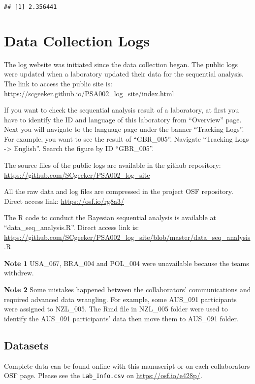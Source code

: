 \documentclass[
  man,floatsintext]{apa7}
\begin{document}
\begin{verbatim}
## [1] 2.356441
\end{verbatim}

\hypertarget{data-collection-logs}{%
\section{Data Collection Logs}\label{data-collection-logs}}

The log website was initiated since the data collection began. The public logs were updated when a laboratory updated their data for the sequential analysis. The link to access the public site is: \url{https://scgeeker.github.io/PSA002_log_site/index.html}

If you want to check the sequential analysis result of a laboratory, at first you have to identify the ID and language of this laboratory from ``Overview'' page. Next you will navigate to the language page under the banner ``Tracking Logs''. For example, you want to see the result of ``GBR\_005''. Navigate ``Tracking Logs -\textgreater{} English''. Search the figure by ID ``GBR\_005''.

The source files of the public logs are available in the github repository:
\url{https://github.com/SCgeeker/PSA002_log_site}

All the raw data and log files are compressed in the project OSF repository. Direct access link: \url{https://osf.io/rg8a3/}

The R code to conduct the Bayesian sequential analysis is available at ``data\_seq\_analysis.R''. Direct access link is: \url{https://github.com/SCgeeker/PSA002_log_site/blob/master/data_seq_analysis.R}

\textbf{Note 1} USA\_067, BRA\_004 and POL\_004 were unavailable because the teams withdrew.

\textbf{Note 2} Some mistakes happened between the collaborators' communications and required advanced data wrangling. For example, some AUS\_091 participants were assigned to NZL\_005. The Rmd file in NZL\_005 folder were used to identify the AUS\_091 participants' data then move them to AUS\_091 folder.

\hypertarget{datasets}{%
\subsection{Datasets}\label{datasets}}

Complete data can be found online with this manuscript or on each collaborators OSF page. Please see the \texttt{Lab\_Info.csv} on \url{https://osf.io/e428p/}.
\end{document}

